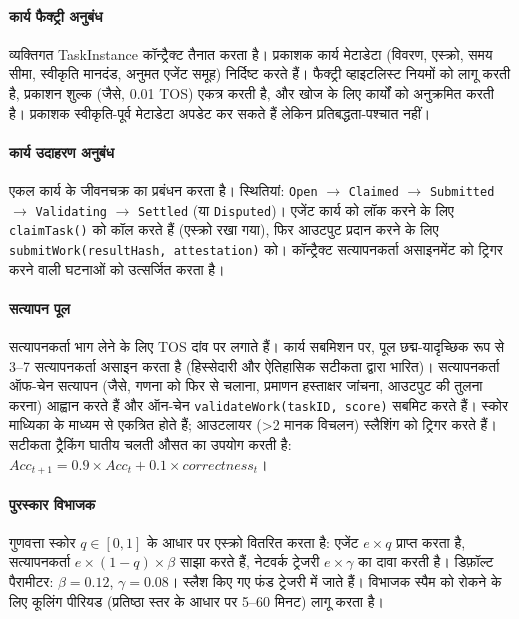 \documentclass[11pt]{article}
\begin{document}
\paragraph{कार्य फैक्ट्री अनुबंध} व्यक्तिगत TaskInstance कॉन्ट्रैक्ट तैनात करता है। प्रकाशक कार्य मेटाडेटा (विवरण, एस्क्रो, समय सीमा, स्वीकृति मानदंड, अनुमत एजेंट समूह) निर्दिष्ट करते हैं। फैक्ट्री व्हाइटलिस्ट नियमों को लागू करती है, प्रकाशन शुल्क (जैसे, 0.01 TOS) एकत्र करती है, और खोज के लिए कार्यों को अनुक्रमित करती है। प्रकाशक स्वीकृति-पूर्व मेटाडेटा अपडेट कर सकते हैं लेकिन प्रतिबद्धता-पश्चात नहीं।

\paragraph{कार्य उदाहरण अनुबंध} एकल कार्य के जीवनचक्र का प्रबंधन करता है। स्थितियां: \texttt{Open} $\rightarrow$ \texttt{Claimed} $\rightarrow$ \texttt{Submitted} $\rightarrow$ \texttt{Validating} $\rightarrow$ \texttt{Settled} (या \texttt{Disputed})। एजेंट कार्य को लॉक करने के लिए \texttt{claimTask()} को कॉल करते हैं (एस्क्रो रखा गया), फिर आउटपुट प्रदान करने के लिए \texttt{submitWork(resultHash, attestation)} को। कॉन्ट्रैक्ट सत्यापनकर्ता असाइनमेंट को ट्रिगर करने वाली घटनाओं को उत्सर्जित करता है।

\paragraph{सत्यापन पूल} सत्यापनकर्ता भाग लेने के लिए TOS दांव पर लगाते हैं। कार्य सबमिशन पर, पूल छद्म-यादृच्छिक रूप से 3--7 सत्यापनकर्ता असाइन करता है (हिस्सेदारी और ऐतिहासिक सटीकता द्वारा भारित)। सत्यापनकर्ता ऑफ-चेन सत्यापन (जैसे, गणना को फिर से चलाना, प्रमाणन हस्ताक्षर जांचना, आउटपुट की तुलना करना) आह्वान करते हैं और ऑन-चेन \texttt{validateWork(taskID, score)} सबमिट करते हैं। स्कोर माध्यिका के माध्यम से एकत्रित होते हैं; आउटलायर (>2 मानक विचलन) स्लैशिंग को ट्रिगर करते हैं। सटीकता ट्रैकिंग घातीय चलती औसत का उपयोग करती है: $Acc_{t+1} = 0.9 \times Acc_t + 0.1 \times correctness_t$।

\paragraph{पुरस्कार विभाजक} गुणवत्ता स्कोर $q \in [0,1]$ के आधार पर एस्क्रो वितरित करता है: एजेंट $e \times q$ प्राप्त करता है, सत्यापनकर्ता $e \times (1-q) \times \beta$ साझा करते हैं, नेटवर्क ट्रेजरी $e \times \gamma$ का दावा करती है। डिफ़ॉल्ट पैरामीटर: $\beta=0.12$, $\gamma=0.08$। स्लैश किए गए फंड ट्रेजरी में जाते हैं। विभाजक स्पैम को रोकने के लिए कूलिंग पीरियड (प्रतिष्ठा स्तर के आधार पर 5--60 मिनट) लागू करता है।
\end{document}

